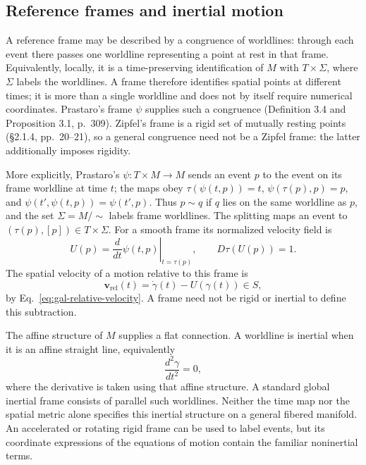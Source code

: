 \subsection{Reference frames and inertial motion}

A reference frame may be described by a congruence of worldlines: through
each event there passes one worldline representing a point at rest in that
frame.  Equivalently, locally, it is a time-preserving identification of
$M$ with $T\times\Sigma$, where $\Sigma$ labels the worldlines.  A frame
therefore identifies spatial points at different times; it is more than a
single worldline and does not by itself require numerical coordinates.
Prastaro's frame $\psi$ supplies such a congruence (Definition 3.4 and
Proposition 3.1, p.~309).  Zipfel's frame is a rigid set of mutually resting
points (\S2.1.4, pp.~20--21), so a general congruence need not be a Zipfel
frame: the latter additionally imposes rigidity.

More explicitly, Prastaro's $\psi:T\times M\to M$ sends an event $p$
to the event on its frame worldline at time $t$; the maps obey
$\tau(\psi(t,p))=t$, $\psi(\tau(p),p)=p$, and
$\psi(t',\psi(t,p))=\psi(t',p)$.  Thus $p\sim q$ if $q$ lies on the
same worldline as $p$, and the set $\Sigma=M/{\sim}$ labels frame
worldlines.  The splitting maps an event to
$(\tau(p),[p])\in T\times\Sigma$.  For a smooth frame its normalized
velocity field is
\begin{equation}\label{eq:gal-frame-field}
 U(p)=\left.\frac{d}{dt}\psi(t,p)\right|_{t=\tau(p)},
 \qquad D\tau(U(p))=1.
\end{equation}
The spatial velocity of a motion relative to this frame is
\begin{equation}\label{eq:gal-frame-relative}
 \mathbf v_{\mathrm{rel}}(t)=\dot\gamma(t)-U(\gamma(t))\in S,
\end{equation}
by Eq.~\eqref{eq:gal-relative-velocity}.  A frame need not be rigid or
inertial to define this subtraction.

The affine structure of $M$ supplies a flat connection.  A worldline is
inertial when it is an affine straight line, equivalently
\begin{equation}\label{eq:gal-inertial}
 \frac{d^2\gamma}{dt^2}=0,
\end{equation}
where the derivative is taken using that affine structure.  A standard global
inertial frame consists of parallel such worldlines.  Neither the time map
nor the spatial metric alone specifies this inertial structure on a general
fibered manifold.  An accelerated or rotating rigid frame can be used to
label events, but its coordinate expressions of the equations of motion
contain the familiar noninertial terms.

